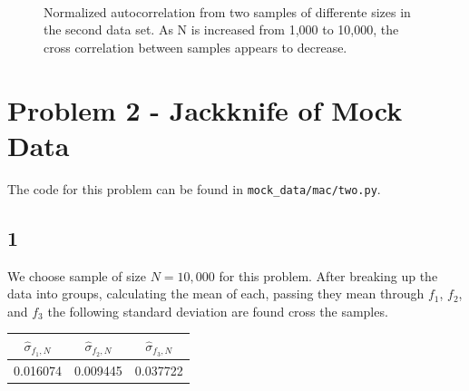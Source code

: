 \documentclass[singlepage,notitlepage,nofootinbib,11pt]{revtex4-1}
\begin{document}
\begin{figure}[h]
\centering
  \captionsetup[subfigure]{labelformat=empty}
  \\
\caption{\label{ok} Normalized autocorrelation from two samples of differente sizes in the second data set. As N is increased from 1,000 to 10,000, the cross correlation between samples appears to decrease.}
\end{figure}
\clearpage
\section{Problem 2 - Jackknife of Mock Data}
\begin{center}The code for this problem can be found in \verb|mock_data/mac/two.py|. \end{center}
\subsection{1}
We choose sample of size $N=10,000$ for this problem. After breaking up the data into groups, calculating the mean of each, passing they mean through $f_1$, $f_2$, and $f_3$ the following standard deviation are found cross the samples.
\begin{center}
\begin{tabular}{| c | c | c |}
\hline
$\hat{\sigma}_{f_1,N}$ & $\hat{\sigma}_{f_2,N}$ & $\hat{\sigma}_{f_3,N}$ \\ \hline\hline
0.016074 & 0.009445 & 0.037722 \\ \hline 
\end{tabular}
\end{center}
\end{document}
